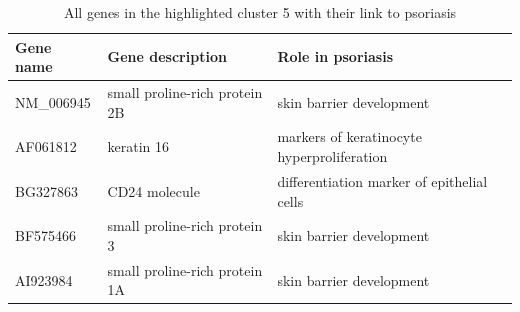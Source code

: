 \documentclass[10pt,a4paper]{article}
\begin{document}
\begin{table}[]
	\centering
	\caption{All genes in the highlighted cluster 5 with their link to psoriasis}
	\label{tab:GenesCluster5}
	\begin{tabular}{l|p{4.5cm} p{8.5cm}}
		\textbf{Gene name} & \textbf{Gene description}                                                                                               & \textbf{Role in psoriasis}                                                                                                                                                                                                                \\ \hline
		NM\_006945         & small proline-rich protein 2B                                                                                           & skin barrier development\cite{roberson2010psoriasis}                                                                                                                                                                                                                  \\
		AF061812           & keratin 16                                                                                                              & markers of keratinocyte hyperproliferation\cite{leigh1995keratins}                                                                                                                                                                                                \\
		BG327863           & CD24 molecule                                                                                                           & differentiation marker of epithelial cells\cite{vegfors2012expression}                                                                                                                                                                                                \\
		BF575466           & small proline-rich protein 3                                                                                            & skin barrier development\cite{kainu2009association}                                                                                                                                                                                                                  \\
		AI923984           & small proline-rich protein 1A                                                                                           & skin barrier development\cite{bergboer2012genetics}                                                                                                                                                                                                                  \\

\end{tabular}
\end{table}
\end{document}
